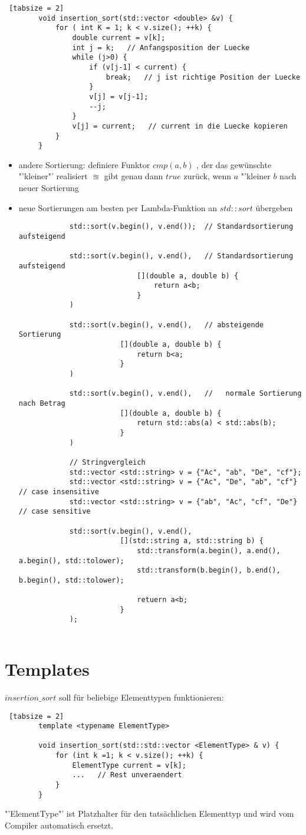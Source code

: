 \documentclass{article}
\begin{document}
	\begin{lstlisting} [tabsize = 2]
		void insertion_sort(std::vector <double> &v) {
			for ( int K = 1; k < v.size(); ++k) {
				double current = v[k];
				int j = k;   // Anfangsposition der Luecke
				while (j>0) {
					if (v[j-1] < current) {
						break;   // j ist richtige Position der Luecke
					}
					v[j] = v[j-1];
					--j;
				}
				v[j] = current;   // current in die Luecke kopieren
			}
		}
	\end{lstlisting}
	\begin{itemize}
		\item andere Sortierung: definiere Funktor $cmp(a,b)$ , der das gewünschte "'kleiner"' realisiert $\approxeq$ gibt genau dann $true$ zurück, wenn $a$ "'kleiner $b$ nach neuer Sortierung
		\item neue Sortierungen am besten per Lambda-Funktion an $std::sort$ übergeben
		\begin{lstlisting}
			std::sort(v.begin(), v.end());  // Standardsortierung aufsteigend
			
			std::sort(v.begin(), v.end(),   // Standardsortierung aufsteigend
							[](double a, double b) {
								return a<b;
							}
			)
			
			std::sort(v.begin(), v.end(),   // absteigende Sortierung
						[](double a, double b) {
							return b<a;
						}
			)
						
			std::sort(v.begin(), v.end(),   //   normale Sortierung nach Betrag
						[](double a, double b) {
							return std::abs(a) < std::abs(b);
						}
			)
			
			// Stringvergleich 
			std::vector <std::string> v = {"Ac", "ab", "De", "cf"};  
			std::vector <std::string> v = {"Ac", "De", "ab", "cf"}  // case insensitive
			std::vector <std::string> v = {"ab", "Ac", "cf", "De"}  // case sensitive
			
			std::sort(v.begin(), v.end(), 
						[](std::string a, std::string b) {
							std::transform(a.begin(), a.end(), a.begin(), std::tolower);
							std::transform(b.begin(), b.end(), b.begin(), std::tolower);
							
							retuern a<b;
						}
			);
			
		\end{lstlisting}
	\end{itemize}
	
	\section{Templates}
	$insertion\_sort$ soll für beliebige Elementtypen funktionieren:
	
	\begin{lstlisting} [tabsize = 2]
		template <typename ElementType>
		
		void insertion_sort(std::std::vector <ElementType> & v) {
			for (int k =1; k < v.size(); ++k) {
				ElementType current = v[k];
				...   // Rest unveraendert
			}
		}
	\end{lstlisting}
	
	"'ElementType"' ist Platzhalter für den tatsächlichen Elementtyp und wird vom Compiler automatisch ersetzt.
	
	
	
\end{document}
